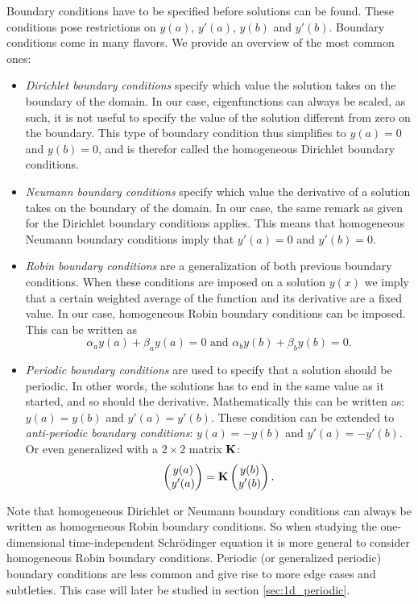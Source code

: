 Boundary conditions have to be specified before solutions can be found. These conditions pose restrictions on $y(a)$, $y'(a)$, $y(b)$ and $y'(b)$. Boundary conditions come in many flavors. We provide an overview of the most common ones:
\begin{itemize}
    \item \emph{Dirichlet boundary conditions} specify which value the solution takes on the boundary of the domain. In our case, eigenfunctions can always be scaled, as such, it is not useful to specify the value of the solution different from zero on the boundary. This type of boundary condition thus simplifies to $y(a) = 0$ and $y(b) = 0$, and is therefor called the homogeneous Dirichlet boundary conditions.
    \item \emph{Neumann boundary conditions} specify which value the derivative of a solution takes on the boundary of the domain. In our case, the same remark as given for the Dirichlet boundary conditions applies. This means that homogeneous Neumann boundary conditions imply that $y'(a) = 0$ and $y'(b) = 0$.
    \item \emph{Robin boundary conditions} are a generalization of both previous boundary conditions. When these conditions are imposed on a solution $y(x)$ we imply that a certain weighted average of the function and its derivative are a fixed value. In our case, homogeneous Robin boundary conditions can be imposed. This can be written as
          $$
              \alpha_a y(a) + \beta_a y(a) = 0 \text{ and } \alpha_b y(b) + \beta_b y(b) = 0  \text{.}
          $$
    \item \emph{Periodic boundary conditions} are used to specify that a solution should be periodic. In other words, the solutions has to end in the same value as it started, and so should the derivative. Mathematically this can be written as: $y(a) = y(b)$ and $y'(a) = y'(b)$. These condition can be extended to \emph{anti-periodic boundary conditions}: $y(a) = -y(b)$ and $y'(a) = -y'(b)$. Or even generalized with a $2 \times 2$ matrix $\vb{K}$:
          $$
              \begin{pmatrix} y(a) \\ y'(a) \end{pmatrix} = \vb{K} \begin{pmatrix} y(b) \\ y'(b) \end{pmatrix}\text{.}
          $$
\end{itemize}

Note that homogeneous Dirichlet or Neumann boundary conditions can always be written as homogeneous Robin boundary conditions. So when studying the one-dimensional time-independent Schrödinger equation it is more general to consider homogeneous Robin boundary conditions. Periodic (or generalized periodic) boundary conditions are less common and give rise to more edge cases and subtleties. This case will later be studied in section \ref{sec:1d_periodic}.


